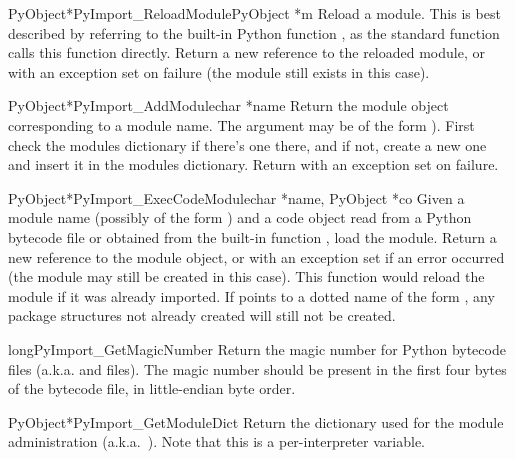 \begin{cfuncdesc}{PyObject*}{PyImport_ReloadModule}{PyObject *m}
  Reload a module.  This is best described by referring to the
  built-in Python function , as
  the standard  function calls this function
  directly.  Return a new reference to the reloaded module, or \NULL{}
  with an exception set on failure (the module still exists in this
  case).
\end{cfuncdesc}

\begin{cfuncdesc}{PyObject*}{PyImport_AddModule}{char *name}
  Return the module object corresponding to a module name.  The
   argument may be of the form ).
  First check the modules dictionary if there's one there, and if not,
  create a new one and insert it in the modules dictionary.
  Return \NULL{} with an exception set on failure.
\end{cfuncdesc}

\begin{cfuncdesc}{PyObject*}{PyImport_ExecCodeModule}{char *name, PyObject *co}
  Given a module name (possibly of the form ) and
  a code object read from a Python bytecode file or obtained from the
  built-in function , load
  the module.  Return a new reference to the module object, or \NULL{}
  with an exception set if an error occurred (the module may still be
  created in this case).  This function would reload the module if it
  was already imported.  If  points to a dotted name of the
  form , any package structures not already
  created will still not be created.
\end{cfuncdesc}

\begin{cfuncdesc}{long}{PyImport_GetMagicNumber}{}
  Return the magic number for Python bytecode files
  (a.k.a.  and  files).  The magic number should
  be present in the first four bytes of the bytecode file, in
  little-endian byte order.
\end{cfuncdesc}

\begin{cfuncdesc}{PyObject*}{PyImport_GetModuleDict}{}
  Return the dictionary used for the module administration
  (a.k.a.\ ).  Note that this is a per-interpreter
  variable.
\end{cfuncdesc}

